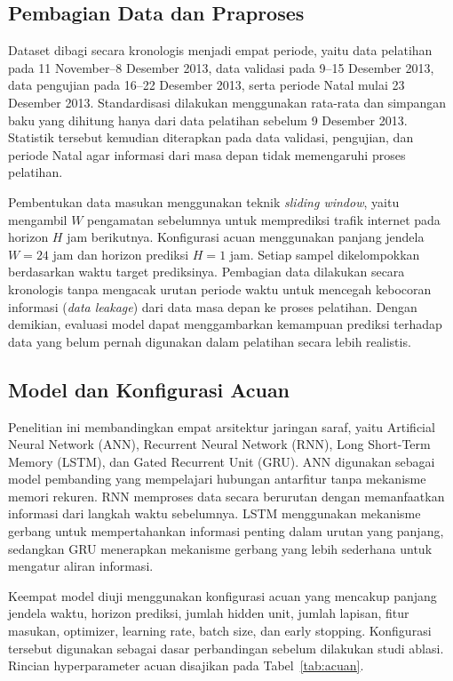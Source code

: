 \documentclass[conference,a4paper]{IEEEtran}
\begin{document}
\subsection{Pembagian Data dan Praproses}

Dataset dibagi secara kronologis menjadi empat periode, yaitu data pelatihan pada 11 November--8 Desember 2013, data validasi pada 9--15 Desember 2013, data pengujian pada 16--22 Desember 2013, serta periode Natal mulai 23 Desember 2013. Standardisasi dilakukan menggunakan rata-rata dan simpangan baku yang dihitung hanya dari data pelatihan sebelum 9 Desember 2013. Statistik tersebut kemudian diterapkan pada data validasi, pengujian, dan periode Natal agar informasi dari masa depan tidak memengaruhi proses pelatihan.

Pembentukan data masukan menggunakan teknik \textit{sliding window}, yaitu mengambil $W$ pengamatan sebelumnya untuk memprediksi trafik internet pada horizon $H$ jam berikutnya. Konfigurasi acuan menggunakan panjang jendela $W=24$ jam dan horizon prediksi $H=1$ jam. Setiap sampel dikelompokkan berdasarkan waktu target prediksinya. Pembagian data dilakukan secara kronologis tanpa mengacak urutan periode waktu untuk mencegah kebocoran informasi (\textit{data leakage}) dari data masa depan ke proses pelatihan. Dengan demikian, evaluasi model dapat menggambarkan kemampuan prediksi terhadap data yang belum pernah digunakan dalam pelatihan secara lebih realistis.

\subsection{Model dan Konfigurasi Acuan}
Penelitian ini membandingkan empat arsitektur jaringan saraf, yaitu Artificial Neural Network (ANN), Recurrent Neural Network (RNN), Long Short-Term Memory (LSTM), dan Gated Recurrent Unit (GRU). ANN digunakan sebagai model pembanding yang mempelajari hubungan antarfitur tanpa mekanisme memori rekuren. RNN memproses data secara berurutan dengan memanfaatkan informasi dari langkah waktu sebelumnya. LSTM menggunakan mekanisme gerbang untuk mempertahankan informasi penting dalam urutan yang panjang, sedangkan GRU menerapkan mekanisme gerbang yang lebih sederhana untuk mengatur aliran informasi.

Keempat model diuji menggunakan konfigurasi acuan yang mencakup panjang jendela waktu, horizon prediksi, jumlah hidden unit, jumlah lapisan, fitur masukan, optimizer, learning rate, batch size, dan early stopping. Konfigurasi tersebut digunakan sebagai dasar perbandingan sebelum dilakukan studi ablasi. Rincian hyperparameter acuan disajikan pada Tabel~\ref{tab:acuan}.
\end{document}
